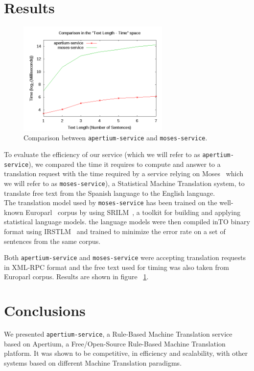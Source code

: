 \documentclass[11pt]{article}
\begin{document}
\section{Results}

\begin{figure}[!ht]
\begin{center}
\includegraphics[width=7.5cm]{comp}
\end{center}
\caption{Comparison between {\tt apertium-service} and {\tt moses-service}.}
\label{fig:comp}
\end{figure}

To evaluate the efficiency of our service (which we will refer to as {\tt apertium-service}), we compared the time it requires to compute and answer to a translation 
request with the time required by a service relying on Moses~\citep{moses} which we will refer to as {\tt moses-service}), a Statistical Machine Translation system, 
to translate free text from the Spanish language to the English language.\\

The translation model used by {\tt moses-service} has been trained on the well-known Europarl~\citep{europarl} corpus by using SRILM~\citep{srilm}, 
a toolkit for building and applying statistical language models. the language models were then compiled inTO binary format using IRSTLM~\citep{irstlm} and 
trained to minimize the error rate on a set of sentences from the same corpus. 

Both {\tt apertium-service} and {\tt moses-service} were accepting translation requests in XML-RPC format and the free text used for timing was also 
taken from Europarl corpus. Results are shown in figure ~\ref{fig:comp}.


\section{Conclusions}

We presented {\tt apertium-service}, a Rule-Based Machine Translation service based on Apertium, a Free/Open-Source Rule-Based Machine Translation platform.
It was shown to be competitive, in efficiency and scalability, with other systems based on different Machine Translation paradigms.
\end{document}
